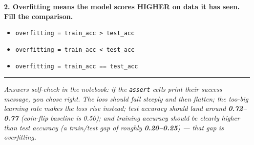 \documentclass[11pt]{article}
\newcommand{\opt}[1]{\texttt{#1}}
\begin{document}
\textbf{2. Overfitting means the model scores HIGHER on data it has seen. Fill the comparison.}
\begin{itemize}
  \item[(a)] \opt{overfitting = train\_acc > test\_acc}
  \item[(b)] \opt{overfitting = train\_acc < test\_acc}
  \item[(c)] \opt{overfitting = train\_acc == test\_acc}
\end{itemize}

\vspace{4pt}\hrule\vspace{3pt}
{\small\itshape Answers self-check in the notebook: if the \texttt{assert} cells print their success
message, you chose right. The loss should fall steeply and then flatten; the too-big learning rate
makes the loss \emph{rise} instead; test accuracy should land around \textbf{0.72--0.77} (coin-flip
baseline is 0.50); and training accuracy should be clearly higher than test accuracy (a train/test
gap of roughly \textbf{0.20--0.25}) --- that gap is overfitting.}
\end{document}
